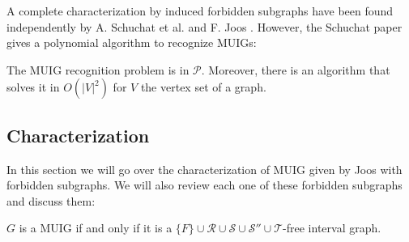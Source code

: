  A complete characterization by induced forbidden subgraphs have been found independently by A. Schuchat et al. \cite{shuchatUnitMixedInterval2014a} and F. Joos \cite{joosCharacterizationMixedUnit2013}. However, the Schuchat paper gives a polynomial algorithm to recognize MUIGs:

\begin{theorem}
  The MUIG recognition problem is in $\mathcal{P}$. Moreover, there is an algorithm that solves it in $O(|V|^2)$ for $V$ the vertex set of a graph.
\end{theorem}

\subsection{Characterization}

In this section we will go over the characterization of MUIG given by Joos with forbidden subgraphs. We will also review each one of these forbidden subgraphs and discuss them:

\begin{theorem}
  $G$ is a MUIG if and only if it is a $\{F\}\cup\mathcal{R}\cup\mathcal{S}\cup\mathcal{S''}\cup\mathcal{T}$-free interval graph.
\end{theorem}


